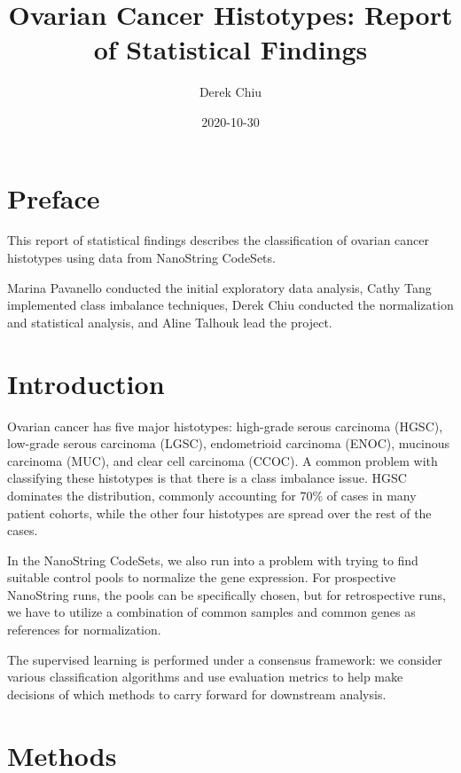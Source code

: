 \documentclass[
]{report}
\title{Ovarian Cancer Histotypes: Report of Statistical Findings}
\author{Derek Chiu}
\date{2020-10-30}
\begin{document}
\maketitle

{
\hypersetup{linkcolor=}
\setcounter{tocdepth}{1}
\tableofcontents
}
\listoftables
\listoffigures
\hypertarget{preface}{%
\chapter*{Preface}\label{preface}}

This report of statistical findings describes the classification of ovarian cancer histotypes using data from NanoString CodeSets.

Marina Pavanello conducted the initial exploratory data analysis, Cathy Tang implemented class imbalance techniques, Derek Chiu conducted the normalization and statistical analysis, and Aline Talhouk lead the project.

\hypertarget{introduction}{%
\chapter{Introduction}\label{introduction}}

Ovarian cancer has five major histotypes: high-grade serous carcinoma (HGSC), low-grade serous carcinoma (LGSC), endometrioid carcinoma (ENOC), mucinous carcinoma (MUC), and clear cell carcinoma (CCOC). A common problem with classifying these histotypes is that there is a class imbalance issue. HGSC dominates the distribution, commonly accounting for 70\% of cases in many patient cohorts, while the other four histotypes are spread over the rest of the cases.

In the NanoString CodeSets, we also run into a problem with trying to find suitable control pools to normalize the gene expression. For prospective NanoString runs, the pools can be specifically chosen, but for retrospective runs, we have to utilize a combination of common samples and common genes as references for normalization.

The supervised learning is performed under a consensus framework: we consider various classification algorithms and use evaluation metrics to help make decisions of which methods to carry forward for downstream analysis.

\hypertarget{methods}{%
\chapter{Methods}\label{methods}}
\end{document}
